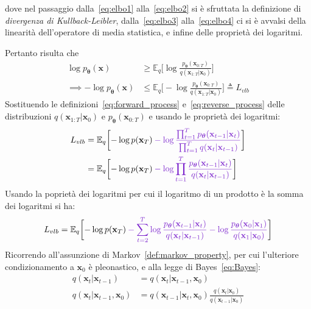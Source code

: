 dove nel passaggio dalla~\eqref{eq:elbo1} alla~\eqref{eq:elbo2} si è sfruttata la definizione di \emph{divergenza di Kullback-Leibler}, 
dalla~\eqref{eq:elbo3} alla~\eqref{eq:elbo4} ci si è avvalsi della linearità dell'operatore di media statistica,
e infine delle proprietà dei logaritmi.

\medskip
\noindent Pertanto risulta che 
\begin{align}
    \log p_{\bm{\theta}}(\mathbf{x})&\geq\mathbb{E}_q\biggl[\log\frac{p_{\bm{\theta}}(\mathbf{x}_{0:T})}{q(\mathbf{x}_{1:T}|\mathbf{x}_0)}\biggr]\\
   \implies-\log p_{\bm{\theta}}(\mathbf{x})&\leq\mathbb{E}_q\biggl[-\log\frac{p_{\bm{\theta}}(\mathbf{x}_{0:T})}{q(\mathbf{x}_{1:T}|\mathbf{x}_0)}\biggr]\triangleq L_{vlb} 
\end{align}
Sostituendo le definizioni~\eqref{eq:forward_process} e~\eqref{eq:reverse_process} delle distribuzioni $q(\mathbf{x}_{1:T}|\mathbf{x}_0)$ e $p_{\bm{\theta}}(\mathbf{x}_{0:T})$ 
e usando le proprietà dei logaritmi:
\begin{equation}
    \begin{split}
    L_{vlb}&=\mathbb{E}_q\biggl[-\log p(\mathbf{x}_T)
    \mathcolor{Purple3}{-\log\frac{\prod_{t=1}^Tp_{\bm{\theta}}(\mathbf{x}_{t-1}|\mathbf{x}_t)}{\prod_{t=1}^Tq(\mathbf{x}_{t}|\mathbf{x}_{t-1})}}\biggr]\\
    &=\mathbb{E}_q\biggl[-\log p(\mathbf{x}_T)
    \mathcolor{Purple3}{-\log\prod_{t=1}^T\frac{p_{\bm{\theta}}(\mathbf{x}_{t-1}|\mathbf{x}_t)}{q(\mathbf{x}_{t}|\mathbf{x}_{t-1})}}\biggr]
    \end{split}
\end{equation}
Usando la poprietà dei logaritmi per cui il logaritmo di un prodotto è la somma dei logaritmi si ha:
\begin{equation}
    L_{vlb}=\mathbb{E}_q\biggl[-\log p(\mathbf{x}_T)
    \mathcolor{Purple3}{-\sum_{t=2}^T\log\frac{p_{\bm{\theta}}(\mathbf{x}_{t-1}|\mathbf{x}_t)}{q(\mathbf{x}_{t}|\mathbf{x}_{t-1})}
    -\log\frac{p_{\bm{\theta}}(\mathbf{x}_0|\mathbf{x}_1)}{q(\mathbf{x}_1|\mathbf{x}_0)}}\biggr] \label{eq:elbo5}
\end{equation}
Ricorrendo all'assunzione di Markov~\eqref{def:markov_property}, per cui l'ulteriore condizionamento a $\mathbf{x}_0$ è pleonastico, e alla legge di Bayes~\eqref{eq:Bayes}:
\begin{align}
    q(\mathbf{x}_t|\mathbf{x}_{t-1})&=q(\mathbf{x}_t|\mathbf{x}_{t-1},\mathbf{x}_0) \label{eq:markov_assumption}\\
    q(\mathbf{x}_t|\mathbf{x}_{t-1},\mathbf{x}_0)&=q(\mathbf{x}_{t-1}|\mathbf{x}_t,\mathbf{x}_0)\frac{q(\mathbf{x}_t|\mathbf{x}_0)}{q(\mathbf{x}_{t-1}|\mathbf{x}_0)}  \label{eq:bayesq}
\end{align}
